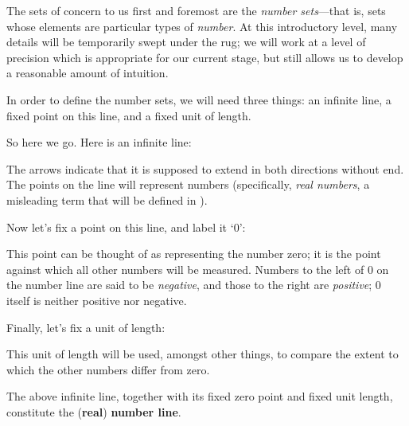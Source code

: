 The sets of concern to us first and foremost are the \textit{number sets}---that is, sets whose elements are particular types of \textit{number}. At this introductory level, many details will be temporarily swept under the rug; we will work at a level of precision which is appropriate for our current stage, but still allows us to develop a reasonable amount of intuition.

In order to define the number sets, we will need three things: an infinite line, a fixed point on this line, and a fixed unit of length.

So here we go. Here is an infinite line:
\begin{center}
\end{center}
The arrows indicate that it is supposed to extend in both directions without end. The points on the line will represent numbers (specifically, \textit{real numbers}, a misleading term that will be defined in ).

Now let's fix a point on this line, and label it `$0$':
\begin{center}
\end{center}
This point can be thought of as representing the number zero; it is the point against which all other numbers will be measured. Numbers to the left of $0$ on the number line are said to be \textit{negative}, and those to the right are \textit{positive}; $0$ itself is neither positive nor negative.

Finally, let's fix a unit of length:
\begin{center}
\end{center}
This unit of length will be used, amongst other things, to compare the extent to which the other numbers differ from zero.

\begin{definition}
\label{defNumberLine}
The above infinite line, together with its fixed zero point and fixed unit length, constitute the (\textbf{real}) \textbf{number line}.
\end{definition}

